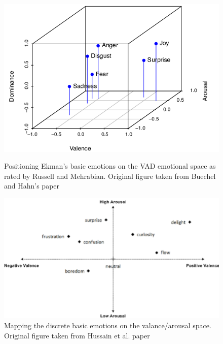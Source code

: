 \documentclass[../main.tex]{subfiles}
\begin{document}
\begin{figure}[htp]
    \centering
    \begin{minipage}[t]{0.4\textwidth}
      \includegraphics[width=\textwidth]{figures/3d_emotionmap.png}
      \caption{Positioning Ekman's basic emotions \cite{Ekman_Theory} on the VAD emotional space as rated by Russell and Mehrabian.\cite{VAD_model}
       Original figure taken from Buechel and Hahn's paper \cite{3d_emotions_figure}}
      \label{fig:3d_emotionmap}
    \end{minipage}
    \hfill
    \begin{minipage}[t]{0.4\textwidth}
      \includegraphics[width=\textwidth]{figures/2d_emotionmap.png}
      \caption{Mapping the discrete basic emotions on the valance/arousal space.
       Original figure taken from Hussain et al. paper \cite{2d_emotions_figure}}
      \label{fig:2d_emotionmap}
    \end{minipage}
  \end{figure}
\end{document}
